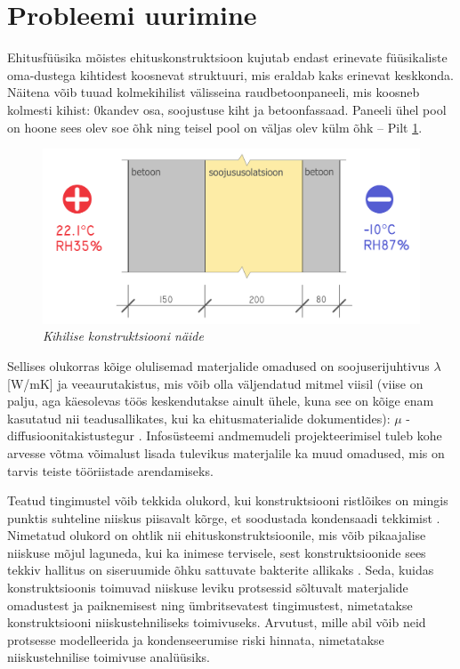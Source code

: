 \section{Probleemi uurimine}
\label{chapters:problem_statement_research}

Ehitusfüüsika mõistes ehituskonstruktsioon kujutab endast erinevate füüsikaliste oma-dustega kihtidest 
koosnevat struktuuri, mis eraldab kaks erinevat keskkonda. Näitena võib tuuad kolmekihilist välisseina raudbetoonpaneeli,
mis koosneb kolmesti kihist: 0kandev osa, soojustuse kiht ja betoonfassaad. Paneeli ühel pool on 
hoone sees olev soe õhk ning teisel pool on väljas olev külm õhk -- Pilt \ref{fig:construction_sample}. 

\begin{figure}[ht]
    \centering
    \includegraphics[width=.8\textwidth]{figures/problem_statement/07_layered_structure_sample.png}
    \caption[Mitmest kihist koosneva ehituskonstruktsiooni näide]{\textit{Kihilise konstruktsiooni näide}}
    \label{fig:construction_sample}
\end{figure}

Sellises olukorras kõige olulisemad materjalide omadused on soojuserijuhtivus \begin{math}\lambda\end{math} [W/mK]
ja veeaurutakistus, mis võib olla väljendatud mitmel viisil (viise on palju, aga käesolevas töös keskendutakse 
ainult ühele, kuna see on kõige enam kasutatud nii teadusallikates, kui ka ehitusmaterialide dokumentides):
\begin{math}\mu\end{math} - diffusioonitakistustegur \cite{building_physics_abc}. Infosüsteemi andmemudeli projekteerimisel tuleb kohe arvesse võtma
võimalust lisada tulevikus materjalile ka muud omadused, mis on tarvis teiste tööriistade arendamiseks.

Teatud tingimustel võib tekkida olukord, kui konstruktsiooni ristlõikes on mingis punktis suhteline niiskus
piisavalt kõrge, et soodustada kondensaadi tekkimist \cite{building_physics_abc}. Nimetatud olukord on ohtlik
nii ehituskonstruktsioonile, mis võib pikaajalise niiskuse mõjul laguneda, kui ka inimese tervisele, sest konstruktsioonide
sees tekkiv hallitus on siseruumide õhku sattuvate bakterite allikaks  \cite{building_physics_abc}. 
Seda, kuidas konstruktsioonis toimuvad niiskuse leviku protsessid sõltuvalt materjalide omadustest ja 
paiknemisest ning ümbritsevatest tingimustest, nimetatakse konstruktsiooni niiskustehniliseks toimivuseks. Arvutust,
mille abil võib neid protsesse modelleerida ja kondenseerumise riski hinnata, nimetatakse niiskustehnilise toimivuse
analüüsiks.

